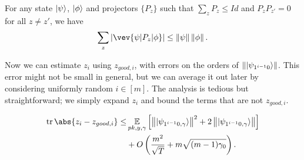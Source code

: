 \begin{cor}\label{lem:samp-tech}
	For any state $\ket{\psi}$,  $\ket{\phi}$ and projectors $\{P_z\}$ such that $\sum_z P_z \leq Id$ and $P_z P_{z'} =0 $ for all $z\neq z'$, we have
	$$  \sum_z |\vev{\psi|P_z|\phi}| \leq \norm{\psi}\norm{\phi}. $$
\end{cor}

Now we can estimate $z_i$ using $z_{good, i}$, with errors on the orders of $\left\lVert\ket{\psi_{1^{i-1}0}}\right\rVert$.
This error might not be small in general,
but we can average it out later by considering uniformly random $i\in[m]$.
The analysis is tedious but straightforward;
we simply expand $z_i$ and bound the terms that are not $z_{good, i}$.

\begin{lemma}
	\label{thm:zi-zgoodi}
	\begin{align*}
	\tr\abs{z_i-z_{good, i}}\leq&\E_{pk, y, \gamma}\L[\norm{\ket{\psi_{1^{i-1}0,\gamma}}}^2+2\norm{\ket{\psi_{1^{i-1}0,\gamma}}}\R]\\
	&+O\L(\frac{m^2}{\sqrt T}+m\sqrt{(m-1)\gamma_0}\R).
	\end{align*}
\end{lemma}

